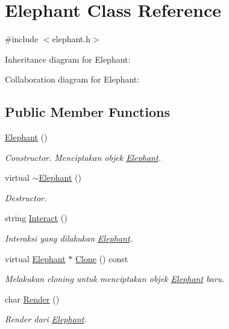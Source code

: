 \hypertarget{classElephant}{}\section{Elephant Class Reference}
\label{classElephant}


{\ttfamily \#include $<$elephant.\+h$>$}



Inheritance diagram for Elephant\+:


Collaboration diagram for Elephant\+:
\subsection*{Public Member Functions}
\begin{DoxyCompactItemize}
\item 
\hyperlink{classElephant_a372cc81064310f2f96db175b747647cb}{Elephant} ()
\begin{DoxyCompactList}\small\item\em Constructor. Menciptakan objek \hyperlink{classElephant}{Elephant}. \end{DoxyCompactList}\item 
virtual \hyperlink{classElephant_aed5fb7142a24a101330af52652909075}{$\sim$\+Elephant} ()
\begin{DoxyCompactList}\small\item\em Destructor. \end{DoxyCompactList}\item 
string \hyperlink{classElephant_a4f2c4bef5ec886019ee88ad575f94fa7}{Interact} ()
\begin{DoxyCompactList}\small\item\em Interaksi yang dilakukan \hyperlink{classElephant}{Elephant}. \end{DoxyCompactList}\item 
virtual \hyperlink{classElephant}{Elephant} $\ast$ \hyperlink{classElephant_a723a7c90f44a95d9886163e605aecea7}{Clone} () const 
\begin{DoxyCompactList}\small\item\em Melakukan cloning untuk menciptakan objek \hyperlink{classElephant}{Elephant} baru. \end{DoxyCompactList}\item 
char \hyperlink{classElephant_a7e412f36e1f88cd278dea76d4f383e95}{Render} ()
\begin{DoxyCompactList}\small\item\em Render dari \hyperlink{classElephant}{Elephant}. \end{DoxyCompactList}\end{DoxyCompactItemize}
